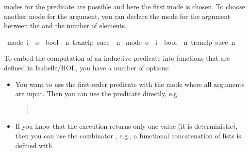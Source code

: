 \begin{isabellebody}
\begin{isamarkuptext}
modes for the predicate  are possible and here the first mode 
is chosen. To choose another mode for the argument, you can declare the mode for the argument between
the \hyperlink{command.values}{\mbox{}} and the number of elements.%
\end{isamarkuptext}%
\isamarkuptrue%
%
\isadelimquote
%
\endisadelimquote
%
\isatagquote
{}\isamarkupfalse%
\ {\isacharbrackleft}mode{\isacharcolon}\ i\ {\isacharequal}{\isachargreater}\ o\ {\isacharequal}{\isachargreater}\ bool{\isacharbrackright}\ {}{}\ {\isachardoublequoteopen}{\isacharbraceleft}n{\isachardot}\ tranclp\ succ\ {}{}\ n{\isacharbraceright}{\isachardoublequoteclose}\isanewline
{}\isamarkupfalse%
\ {\isacharbrackleft}mode{\isacharcolon}\ o\ {\isacharequal}{\isachargreater}\ i\ {\isacharequal}{\isachargreater}\ bool{\isacharbrackright}\ {}{}\ {\isachardoublequoteopen}{\isacharbraceleft}n{\isachardot}\ tranclp\ succ\ n\ {}{}{\isacharbraceright}{\isachardoublequoteclose}%
\endisatagquote
{\isafoldquote}%
%
\isadelimquote
%
\endisadelimquote
%
\isamarkuptrue%
%
\begin{isamarkuptext}%
To embed the computation of an inductive predicate into functions that are defined in Isabelle/HOL,
you have a number of options:
\begin{itemize}
\item You want to use the first-order predicate with the mode
  where all arguments are input. Then you can use the predicate directly, e.g.
\begin{quote}
  \\
\end{quote}
\item If you know that the execution returns only one value (it is deterministic), then you can
  use the combinator , e.g., a functional concatenation of lists
  is defined with
\begin{quote}

\end{quote}
\end{itemize}
\end{isamarkuptext}
\end{isabellebody}

